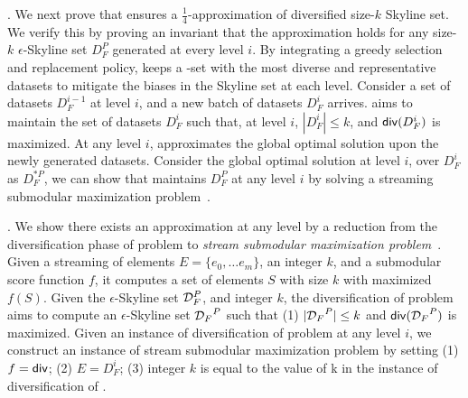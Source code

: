  


. 
We next prove that \divmodis ensures a $\frac{1}{4}$-approximation of diversified size-$k$ Skyline set.
We verify this by proving an invariant that 
the approximation holds  
for any size-$k$ $\epsilon$-Skyline set $D^P_F$ 
generated at every level $i$.
By integrating a greedy selection and replacement policy, \divmodis keeps a 
-set with the most diverse and representative datasets to mitigate the biases in the Skyline set at each level.
Consider a set of datasets $D^{i-1}_F$
at level $i$, and a new batch of
datasets $D^i_F$ arrives. \divmodis
aims to maintain the set of datasets 
$D^i_F$ such that, at level $i$, $|D^i_F| \leq k$, and ${\mathsf{div}}(D^i_F)$ is maximized. At any level $i$,
\divmodis approximates the global 
optimal solution upon the newly generated datasets.
Consider the global optimal solution 
at level $i$, over $D_F^i$ as $D_F^{*P}$,
we can show that \divmodis maintains
$D^P_F$ at any level $i$ by solving 
a streaming submodular maximization
problem~\cite{chakrabarti2015submodular}.

.
We show there exists an approximation at any level by a 
reduction from the diversification phase of \modis problem 
 to {\em stream submodular maximization problem}~\cite{badanidiyuru2014streaming,chakrabarti2015submodular}.
 Given a streaming of elements $E = \{e_0, \ldots e_m\}$, an integer $k$, and a submodular 
score function $f$, it
computes a set of elements $S$ with size $k$ 
with maximized $f(S)$.
Given the $\epsilon$-Skyline set ${\mathcal D}_F^P$, and integer $k$, the diversification of \modis problem
aims to compute an $\epsilon$-Skyline set ${{\mathcal D}_F}^{P}$ such that (1) $|{{\mathcal D}_F}^{P}| \leq k$
and ${\mathsf{div}}({{\mathcal D}_F}^{P})$ is maximized.
Given an instance of diversification of \modis
problem at any level $i$, we construct 
an instance of stream submodular maximization problem by setting (1) $f = {\mathsf{div}}$; 
(2) $E =  D_F^i$; (3) integer $k$ is equal
to the value of k in the instance of diversification of \modis.

